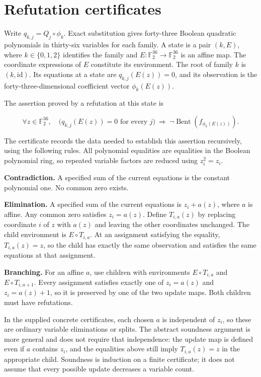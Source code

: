 \documentclass[pdflatex,sn-mathphys-num]{sn-jnl}
\begin{document}
\section{Refutation certificates}\label{sec:4}

Write $q_{k,j}=Q_j\circ\phi_k$. Exact substitution gives forty-three Boolean quadratic polynomials in thirty-six variables for each family. A state is a pair $(k,E)$, where $k\in\{0,1,2\}$ identifies the family and $E:\mathbb F_2^{36}\to\mathbb F_2^{36}$ is an affine map. The coordinate expressions of $E$ constitute its environment. The root of family $k$ is $(k,\mathrm{id})$. Its equations at a state are $q_{k,j}(E(z))=0$, and its observation is the forty-three-dimensional coefficient vector $\phi_k(E(z))$.

The assertion proved by a refutation at this state is

\[
\forall z\in\mathbb F_2^{36},\quad
\bigl(q_{k,j}(E(z))=0\text{ for every }j\bigr)
\ \Longrightarrow\ \neg\operatorname{Bent}(f_{\phi_k(E(z))}).
\]

The certificate records the data needed to establish this assertion recursively, using the following rules. All polynomial equalities are equalities in the Boolean polynomial ring, so repeated variable factors are reduced using $z_i^2=z_i$.

\textbf{Contradiction.} A specified sum of the current equations is the constant polynomial one. No common zero exists.

\textbf{Elimination.} A specified sum of the current equations is $z_i+a(z)$, where $a$ is affine. Any common zero satisfies $z_i=a(z)$. Define $T_{i,a}(z)$ by replacing coordinate $i$ of $z$ with $a(z)$ and leaving the other coordinates unchanged. The child environment is $E\circ T_{i,a}$. At an assignment satisfying the equality, $T_{i,a}(z)=z$, so the child has exactly the same observation and satisfies the same equations at that assignment.

\textbf{Branching.} For an affine $a$, use children with environments $E\circ T_{i,a}$ and $E\circ T_{i,a+1}$. Every assignment satisfies exactly one of $z_i=a(z)$ and $z_i=a(z)+1$, so it is preserved by one of the two update maps. Both children must have refutations.

In the supplied concrete certificates, each chosen $a$ is independent of $z_i$, so these are ordinary variable eliminations or splits. The abstract soundness argument is more general and does not require that independence: the update map is defined even if $a$ contains $z_i$, and the equalities above still imply $T_{i,a}(z)=z$ in the appropriate child. Soundness is induction on a finite certificate; it does not assume that every possible update decreases a variable count.
\end{document}
